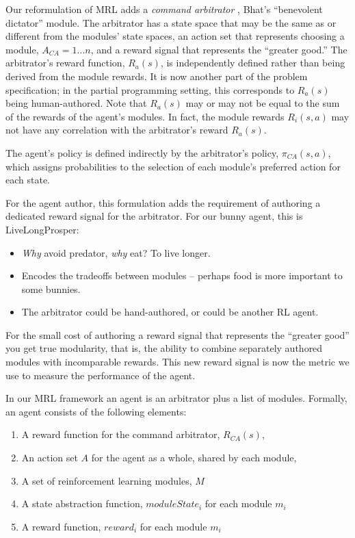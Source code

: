 Our reformulation of MRL adds a {\em command arbitrator} \cite{brooks1986a-robust}, Bhat's ``benevolent dictator'' module.  The arbitrator has a state space that may be the same as or different from the modules' state spaces, an action set that represents choosing a module, $A_{CA} = {1 ... n}$, and a reward signal that represents the ``greater good.'' The arbitrator's reward function, $R_a(s)$, is independently defined rather than being derived from the module rewards.  It is now another part of the problem specification; in the partial programming setting, this corresponds to $R_a(s)$ being human-authored. Note that $R_a(s)$ may or may not be equal to the sum of the rewards of the agent's modules. In fact, the module rewards $R_i(s,a)$ may not have any correlation with the arbitrator's reward $R_a(s)$.

The agent's policy is defined indirectly by the arbitrator's policy, $\pi_{CA}(s, a)$, which assigns probabilities to the selection of each module's preferred action for each state.

For the agent author, this formulation adds the requirement of authoring a dedicated reward signal for the arbitrator.  For our bunny agent, this is LiveLongProsper:

\begin{itemize}
\item {\em Why} avoid predator, {\em why} eat? To live longer.
\item Encodes the tradeoffs between modules -- perhaps food is more
  important to some bunnies.
\item The arbitrator could be hand-authored, or could be another RL
  agent.
\end{itemize}

For the small cost of authoring a reward signal that represents the ``greater good'' you get true modularity, that is, the ability to combine separately authored modules with incomparable rewards.  This new reward signal is now the metric we use to measure the performance of the agent.

In our MRL framework an agent is an arbitrator plus a list of modules. Formally, an agent consists of the following elements:

\begin{enumerate}
\item A reward function for the command arbitrator, $R_{CA}(s)$,
\item An action set $A$ for the agent as a whole, shared by each module,
\item A set of reinforcement learning modules, $M$
\item A state abstraction function, $moduleState_i$ for each module $m_i$
\item A reward function, $reward_i$ for each module $m_i$
\end{enumerate}


